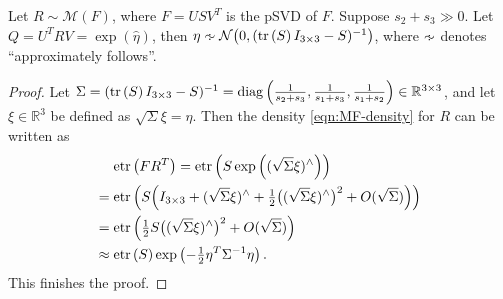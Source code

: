 \begin{theorem} \label{thm:MF-approx-1d}
	Let $R\sim\mathcal{M}(F)$, where $F=USV^T$ is the pSVD of $F$.
	Suppose $s_2+s_3\gg 0$.
	Let $Q = U^TRV = \exp\left(\hat{\eta}\right)$, then $\eta \approxsim \mathcal{N}\big( 0,\allowbreak (\tr{S}I_{3\times 3}-S)^{-1} \big)$, where $\approxsim$ denotes ``approximately follows''.
\end{theorem}
\begin{proof}
	Let $\Sigma = (\mathrm{tr}\left( S \right)I_{3 \times 3}-S)^{-1} = \mathrm{diag}\left(\frac{1}{s_2+s_3},\frac{1}{s_1+s_3},\frac{1}{s_1+s_2}\right) \in\mathbb{R}^{3\times 3}$, and let $\xi\in\mathbb{R}^3$ be defined as $\sqrt{\Sigma}\xi = \eta$.
	Then the density \eqref{eqn:MF-density} for $R$ can be written as
	\begin{align*}
		&\mathrm{etr}\left( FR^T \right) = \mathrm{etr}\left( S\exp\left( (\sqrt{\Sigma}\xi)^\wedge \right) \right) \\
		=\; &\mathrm{etr}\left( S \Big( I_{3\times 3} + (\sqrt{\Sigma}\xi)^\wedge + \tfrac{1}{2} \big((\sqrt{\Sigma}\xi)^\wedge\big)^2 + O(\sqrt{\Sigma}) \Big) \right) \\
		=\; &\mathrm{etr}\left( \tfrac{1}{2}S\big((\sqrt{\Sigma}\xi)^\wedge\big)^2 + O(\sqrt{\Sigma}) \right) \\
		\approx\; &\mathrm{etr}\left( S \right) \exp\left(-\tfrac{1}{2}\eta^T\Sigma^{-1}\eta\right).
	\end{align*}
	This finishes the proof.
\end{proof}

